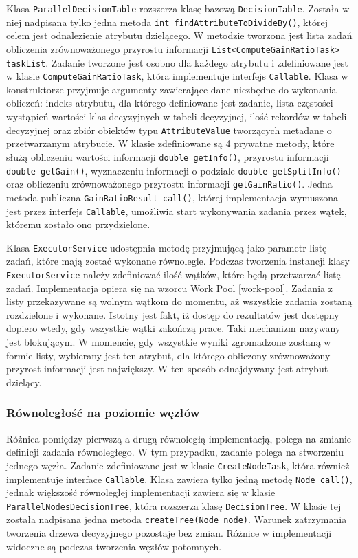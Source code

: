 \documentclass[12pt]{article}
\begin{document}
Klasa \verb|ParallelDecisionTable| rozszerza klasę bazową \verb|DecisionTable|.
Została w niej nadpisana tylko jedna metoda \verb|int findAttributeToDivideBy()|, której celem jest odnalezienie atrybutu dzielącego.
W metodzie tworzona jest lista zadań obliczenia zrównoważonego przyrostu informacji \verb|List<ComputeGainRatioTask> taskList|.
Zadanie tworzone jest osobno dla każdego atrybutu i zdefiniowane jest w klasie \verb|ComputeGainRatioTask|, która implementuje interfejs \verb|Callable|.
Klasa w konstruktorze przyjmuje argumenty zawierające dane niezbędne do wykonania obliczeń:
indeks atrybutu, dla którego definiowane jest zadanie, lista częstości wystąpień
wartości klas decyzyjnych w tabeli decyzyjnej, ilość rekordów w tabeli decyzyjnej oraz zbiór obiektów typu \verb|AttributeValue|
tworzących metadane o przetwarzanym atrybucie. W klasie zdefiniowane są 4 prywatne metody, które służą obliczeniu wartości informacji \verb|double getInfo()|,
przyrostu informacji \verb|double getGain()|, wyznaczeniu informacji o podziale \verb|double getSplitInfo()|
oraz obliczeniu zrównoważonego przyrostu informacji \verb|getGainRatio()|. Jedna metoda publiczna \verb|GainRatioResult call()|, której
implementacja wymuszona jest przez interfejs \verb|Callable|, umożliwia start wykonywania zadania przez wątek, któremu zostało ono przydzielone.

Klasa \verb|ExecutorService| udostępnia metodę przyjmującą jako parametr listę zadań, które mają zostać wykonane równolegle. Podczas tworzenia instancji
klasy \verb|ExecutorService| należy zdefiniować ilość wątków, które będą przetwarzać listę zadań. Implementacja opiera się na wzorcu Work Pool \ref{work-pool}.
Zadania z listy przekazywane są wolnym wątkom do momentu, aż wszystkie zadania zostaną rozdzielone i wykonane. Istotny jest fakt, iż dostęp do rezultatów
jest dostępny dopiero wtedy, gdy wszystkie wątki zakończą prace. Taki mechanizm nazywany jest blokującym. W momencie, gdy wszystkie wyniki zgromadzone
zostaną w formie listy, wybierany jest ten atrybut, dla którego obliczony zrównoważony przyrost informacji jest największy. W ten sposób odnajdywany jest atrybut dzielący.

\subsubsection{Równoległość na poziomie węzłów}

Różnica pomiędzy pierwszą a drugą równoległą implementacją, polega na zmianie definicji zadania równoległego. W tym przypadku, zadanie polega na stworzeniu jednego
węzła. Zadanie zdefiniowane jest w klasie \verb|CreateNodeTask|, która również implementuje interface \verb|Callable|. Klasa zawiera tylko jedną metodę
\verb|Node call()|, jednak większość równoległej implementacji zawiera się w klasie \verb|ParallelNodesDecisionTree|, która rozszerza klasę \verb|DecisionTree|.
W klasie tej została nadpisana jedna metoda \verb|createTree(Node node)|. Warunek zatrzymania tworzenia drzewa decyzyjnego pozostaje bez zmian. Różnice w
implementacji widoczne są podczas tworzenia węzłów potomnych.
\end{document}
